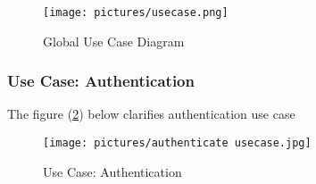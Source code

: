 \documentclass[12pt]{report}
\begin{document}
\begin{figure}[!htbp]

        \centering
    \texttt{[image: pictures/usecase.png]}
    \caption{Global Use Case Diagram}
    \label{fig:usecasediagram}
\end{figure}










\pagebreak
\subsubsection{Use Case: Authentication}
The figure (\ref{fig:auth}) below clarifies authentication use case

\begin{figure}[!htbp]

        \centering
    \texttt{[image: pictures/authenticate usecase.jpg]}
    \caption{Use Case: Authentication}
    \label{fig:auth}

\end{figure}
\end{document}
